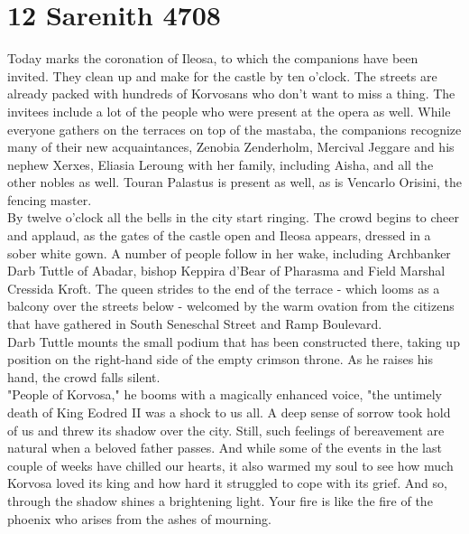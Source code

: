 \section{12 Sarenith 4708}

Today marks the coronation of Ileosa, to which the companions have been invited. They clean up and make for the castle by ten o'clock. The streets are already packed with hundreds of Korvosans who don't want to miss a thing. The invitees include a lot of the people who were present at the opera as well. While everyone gathers on the terraces on top of the mastaba, the companions recognize many of their new acquaintances, Zenobia Zenderholm, Mercival Jeggare and his nephew Xerxes, Eliasia Leroung with her family, including Aisha, and all the other nobles as well. Touran Palastus is present as well, as is Vencarlo Orisini, the fencing master.\\

By twelve o'clock all the bells in the city start ringing. The crowd begins to cheer and applaud, as the gates of the castle open and Ileosa appears, dressed in a sober white gown. A number of people follow in her wake, including Archbanker Darb Tuttle of Abadar, bishop Keppira d'Bear of Pharasma and Field Marshal Cressida Kroft. The queen strides to the end of the terrace - which looms as a balcony over the streets below - welcomed by the warm ovation from the citizens that have gathered in South Seneschal Street and Ramp Boulevard.\\

Darb Tuttle mounts the small podium that has been constructed there, taking up position on the right-hand side of the empty crimson throne. As he raises his hand, the crowd falls silent.\\

"People of Korvosa," he booms with a magically enhanced voice, "the untimely death of King Eodred II was a shock to us all. A deep sense of sorrow took hold of us and threw its shadow over the city. Still, such feelings of bereavement are natural when a beloved father passes. And while some of the events in the last couple of weeks have chilled our hearts, it also warmed my soul to see how much Korvosa loved its king and how hard it struggled to cope with its grief. And so, through the shadow shines a brightening light. Your fire is like the fire of the phoenix who arises from the ashes of mourning.\\

